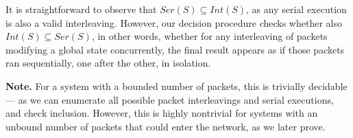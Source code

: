 \begin{tcolorbox}[colback=white, colframe=black, boxrule=0.5mm, arc=0mm]
\end{tcolorbox}

It is straightforward to observe that $Ser(S) \subseteq Int(S)$, as any serial 
execution is also a valid interleaving. 
%
However, our decision procedure checks whether also $Int(S) \subseteq Ser(S)$, 
in other 
words, 
whether for any interleaving of packets modifying a global state concurrently, 
the final result appears as if those packets ran sequentially, one after the 
other, in isolation. 
%

\medskip
\noindent
\textbf{Note.}
For a system with a bounded number of packets, this is trivially decidable --- 
as we can enumerate all possible packet interleavings and serial executions, 
and check inclusion. 
%
However, this is highly nontrivial for systems with an unbound number of packets 
that could enter the network, as we later prove. 


